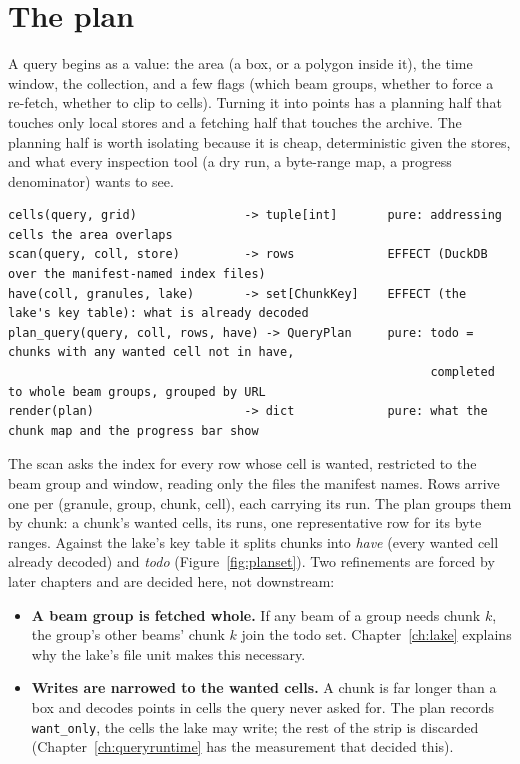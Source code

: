 \documentclass[10pt,a4paper]{article}
\newcommand{\code}[1]{\texttt{#1}}
\begin{document}
\section{The plan}
\label{ch:plan}

A query begins as a value: the area (a box, or a polygon inside it), the time window, the collection, and a few
flags (which beam groups, whether to force a re-fetch, whether to clip to cells). Turning it into points has a
planning half that touches only local stores and a fetching half that touches the archive. The planning half is
worth isolating because it is cheap, deterministic given the stores, and what every inspection tool (a dry run, a
byte-range map, a progress denominator) wants to see.

\begin{Verbatim}[fontsize=\footnotesize]
cells(query, grid)               -> tuple[int]       pure: addressing cells the area overlaps
scan(query, coll, store)         -> rows             EFFECT (DuckDB over the manifest-named index files)
have(coll, granules, lake)       -> set[ChunkKey]    EFFECT (the lake's key table): what is already decoded
plan_query(query, coll, rows, have) -> QueryPlan     pure: todo = chunks with any wanted cell not in have,
                                                           completed to whole beam groups, grouped by URL
render(plan)                     -> dict             pure: what the chunk map and the progress bar show
\end{Verbatim}

The scan asks the index for every row whose cell is wanted, restricted to the beam group and window, reading only
the files the manifest names. Rows arrive one per (granule, group, chunk, cell), each carrying its run. The plan
groups them by chunk: a chunk's wanted cells, its runs, one representative row for its byte ranges. Against the
lake's key table it splits chunks into \emph{have} (every wanted cell already decoded) and \emph{todo}
(Figure~\ref{fig:planset}). Two refinements are forced by later chapters and are decided here, not downstream:

\begin{itemize}
\item \textbf{A beam group is fetched whole.} If any beam of a group needs chunk $k$, the group's other beams'
  chunk $k$ join the todo set. Chapter~\ref{ch:lake} explains why the lake's file unit makes this necessary.
\item \textbf{Writes are narrowed to the wanted cells.} A chunk is far longer than a box and decodes points in
  cells the query never asked for. The plan records \code{want\_only}, the cells the lake may write; the rest of the
  strip is discarded (Chapter~\ref{ch:queryruntime} has the measurement that decided this).
\end{itemize}
\end{document}
